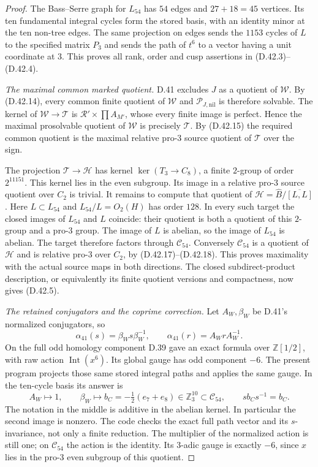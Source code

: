 \begin{proof}
The Bass--Serre graph for $L_{54}$ has
$54$ edges and $27+18=45$ vertices. Its
ten fundamental integral cycles form the
stored basis, with an identity minor at
the ten non-tree edges. The same projection
on edges sends the $1153$ cycles of $L$
to the specified matrix $P_3$ and sends
the path of $t^6$ to a vector having a
unit coordinate at $3$. This proves all
rank, order and cusp assertions in
(D.42.3)--(D.42.4).

\emph{The maximal common marked quotient.}
D.41 excludes $J$ as a quotient of $\mathcal W$.
By (D.42.14), every common finite quotient
of $\mathcal W$ and $\mathcal P_{J,\mathrm{nil}}$
is therefore solvable. The kernel of
$\mathcal W\to\mathcal T$ is
$\mathcal R'\times\prod A_{M'}$, whose
every finite image is perfect. Hence the
maximal prosolvable quotient of $\mathcal W$
is precisely $\mathcal T$. By (D.42.15)
the required common quotient is the
maximal relative pro-$3$ source quotient
of $\mathcal T$ over the sign.

The projection $\mathcal T\to\mathcal H$
has kernel $\ker(T_3\to C_8)$, a finite
$2$-group of order $2^{11151}$. This
kernel lies in the even subgroup. Its
image in a relative pro-$3$ source
quotient over $C_2$ is trivial.
It remains to compute that quotient
of $\mathcal H=\widehat B/\overline{[L,L]}$.
Here $L\subset L_{54}$ and
$L_{54}/L=O_2(H)$ has order $128$.
In every such target the closed images
of $L_{54}$ and $L$ coincide: their
quotient is both a quotient of this
$2$-group and a pro-$3$ group.
The image of $L$ is abelian, so the
image of $L_{54}$ is abelian. The target
therefore factors through
$\mathcal C_{54}$. Conversely
$\mathcal C_{54}$ is a quotient of
$\mathcal H$ and is relative pro-$3$
over $C_2$, by (D.42.17)--(D.42.18).
This proves maximality with the actual
source maps in both directions.
The closed subdirect-product description,
or equivalently its finite quotient
versions and compactness, now gives
(D.42.5).

\emph{The retained conjugators and the coprime correction.}
Let $A_W,\beta_W$ be D.41's normalized
conjugators, so
\[
 \alpha_{41}(s)=\beta_Ws\beta_W^{-1},\qquad
 \alpha_{41}(r)=A_WrA_W^{-1}.
\]
On the full odd homology component D.39
gave an exact formula over $\mathbb Z[1/2]$,
with raw action $\operatorname{Int}(x^6)$.
Its global gauge has odd component $-6$.
The present program projects those same
stored integral paths and applies the
same gauge. In the ten-cycle basis its
answer is
\[
 A_W\longmapsto1,\qquad
 \beta_W\longmapsto b_C
       =-\tfrac12(e_7+e_8)
          \in\mathbb Z_3^{10}\subset\mathcal C_{54},
 \qquad sb_Cs^{-1}=b_C.                               \tag{D.42.19}
\]
The notation in the middle is additive
in the abelian kernel. In particular
the second image is nonzero. The code
checks the exact full path vector and
its $s$-invariance, not only a finite
reduction. The multiplier of the
normalized action is still one; on
$\mathcal C_{54}$ the action is the
identity. Its $3$-adic gauge is exactly
$-6$, since $x$ lies in the pro-$3$
even subgroup of this quotient.


\end{proof}
